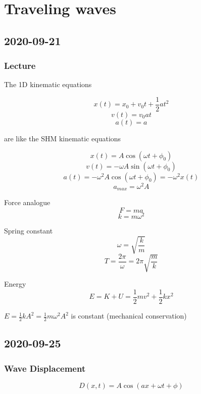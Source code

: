 \chapter{Traveling waves}

\section{2020-09-21}

\subsection{Lecture}

The 1D kinematic equations 

$$x(t) = x_0 + v_0t + \frac{1}{2}at^2$$
$$v(t) = v_0 at$$
$$a(t) = a$$

are like the SHM kinematic equations 

$$x(t) = A\cos(\omega t + \phi_0)$$
$$v(t) = -\omega A\sin(\omega t + \phi_0)$$
$$a(t) = -\omega^2 A\cos(\omega t + \phi_0) = -\omega^2 x(t)$$
$$a_{max} = \omega^2 A$$

Force analogue
$$F = ma$$
$$k = m\omega^2$$

Spring constant
$$\omega = \sqrt{\frac{k}{m}}$$
$$T = \frac{2\pi}{\omega} = 2\pi \sqrt{\frac{m}{k}}$$

Energy
$$E = K + U = \frac{1}{2}mv^2 + \frac{1}{2}kx^2$$

$E = \frac{1}{2}kA^2 = \frac{1}{2} m \omega^2 A^2$ is constant (mechanical conservation)

\section{2020-09-25}

\subsection{Wave Displacement}

$$D(x,t) = A \cos (ax + \omega t + \phi)$$

